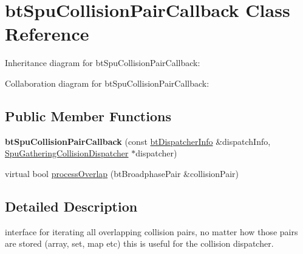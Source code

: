 \hypertarget{classbt_spu_collision_pair_callback}{\section{bt\+Spu\+Collision\+Pair\+Callback Class Reference}
\label{classbt_spu_collision_pair_callback}
}


Inheritance diagram for bt\+Spu\+Collision\+Pair\+Callback\+:


Collaboration diagram for bt\+Spu\+Collision\+Pair\+Callback\+:
\subsection*{Public Member Functions}
\begin{DoxyCompactItemize}
\item 
\hypertarget{classbt_spu_collision_pair_callback_a548a2b6d1f3ca76458f6343c69b9fae9}{{\bfseries bt\+Spu\+Collision\+Pair\+Callback} (const \hyperlink{structbt_dispatcher_info}{bt\+Dispatcher\+Info} \&dispatch\+Info, \hyperlink{class_spu_gathering_collision_dispatcher}{Spu\+Gathering\+Collision\+Dispatcher} $\ast$dispatcher)}\label{classbt_spu_collision_pair_callback_a548a2b6d1f3ca76458f6343c69b9fae9}

\item 
virtual bool \hyperlink{classbt_spu_collision_pair_callback_ae832c301c592c9fa65bc17e10cc3e3c2}{process\+Overlap} (bt\+Broadphase\+Pair \&collision\+Pair)
\end{DoxyCompactItemize}


\subsection{Detailed Description}
interface for iterating all overlapping collision pairs, no matter how those pairs are stored (array, set, map etc) this is useful for the collision dispatcher. 

